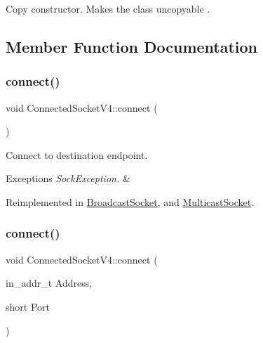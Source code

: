 Copy constructor. Makes the class uncopyable . 

\subsection{Member Function Documentation}
\mbox{\label{classConnectedSocketV4_a034d0c949fa1a0f14c136f839915d1a4}} 
\subsubsection{\texorpdfstring{connect()}{connect()}\hspace{0.1cm}{\footnotesize\ttfamily [1/4]}}
{\footnotesize\ttfamily void Connected\+Socket\+V4\+::connect (\begin{DoxyParamCaption}{ }\end{DoxyParamCaption})\hspace{0.3cm}{\ttfamily [virtual]}}

Connect to destination endpoint. 
\begin{DoxyExceptions}{Exceptions}
{\em Sock\+Exception.} & \\
\hline
\end{DoxyExceptions}


Reimplemented in \hyperlink{classBroadcastSocket_a330f3448f2c53eef77af683cfd94eafd}{Broadcast\+Socket}, and \hyperlink{classMulticastSocket_a30ffd3d7fe782c2d74d69d994e465a4d}{Multicast\+Socket}.

\mbox{\label{classConnectedSocketV4_a9998be702c3a10a686bc6dfd914a10fe}} 
\subsubsection{\texorpdfstring{connect()}{connect()}\hspace{0.1cm}{\footnotesize\ttfamily [2/4]}}
{\footnotesize\ttfamily void Connected\+Socket\+V4\+::connect (\begin{DoxyParamCaption}\item[{in\+\_\+addr\+\_\+t}]{Address,  }\item[{short}]{Port }\end{DoxyParamCaption})\hspace{0.3cm}{\ttfamily [inline]}}

